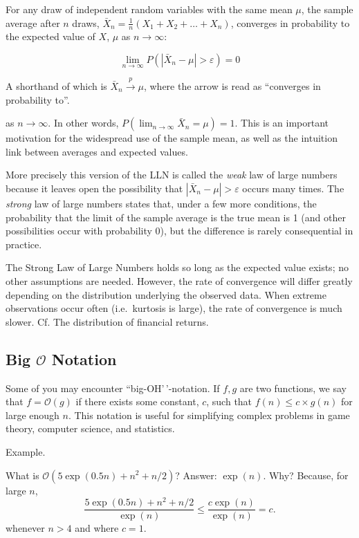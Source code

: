 \documentclass[
]{book}
\begin{document}
\begin{theorem}
\protect\hypertarget{thm:lln}{}\label{thm:lln}For any draw of independent random variables with the same mean \(\mu\), the sample average after \(n\) draws, \(\bar{X}_n = \frac{1}{n}(X_1 + X_2 + \ldots + X_n)\), converges in probability to the expected value of \(X\), \(\mu\) as \(n \rightarrow \infty\):

\[\lim\limits_{n\to \infty} P(|\bar{X}_n - \mu | > \varepsilon) = 0\]

A shorthand of which is \(\bar{X}_n \xrightarrow{p} \mu\), where the arrow is read as ``converges in probability to''.
\end{theorem}

as \(n\to \infty\). In other words, \(P( \lim_{n\to\infty}\bar{X}_n = \mu) = 1\). This is an important motivation for the widespread use of the sample mean, as well as the intuition link between averages and expected values.

More precisely this version of the LLN is called the \emph{weak} law of large numbers because it leaves open the possibility that \(|\bar{X}_n - \mu | > \varepsilon\) occurs many times. The \emph{strong} law of large numbers states that, under a few more conditions, the probability that the limit of the sample average is the true mean is 1 (and other possibilities occur with probability 0), but the difference is rarely consequential in practice.

The Strong Law of Large Numbers holds so long as the expected value exists; no other assumptions are needed. However, the rate of convergence will differ greatly depending on the distribution underlying the observed data. When extreme observations occur often (i.e.~kurtosis is large), the rate of convergence is much slower. Cf. The distribution of financial returns.

\hypertarget{big-mathcalo-notation}{%
\subsection{\texorpdfstring{Big \(\mathcal{O}\) Notation}{Big \textbackslash mathcal\{O\} Notation}}\label{big-mathcalo-notation}}

Some of you may encounter ``big-OH'\,'-notation. If \(f, g\) are two functions, we say that \(f = \mathcal{O}(g)\) if there exists some constant, \(c\), such that \(f(n) \leq c \times g(n)\) for large enough \(n\). This notation is useful for simplifying complex problems in game theory, computer science, and statistics.

Example.

What is \(\mathcal{O}( 5\exp(0.5 n) + n^2 + n / 2)\)? Answer: \(\exp(n)\). Why? Because, for large \(n\),
\[
\frac{ 5\exp(0.5 n) + n^2 + n / 2 }{ \exp(n)} \leq \frac{ c \exp(n) }{ \exp(n)} = c. 
\]
whenever \(n > 4\) and where \(c = 1\).

\end{document}
